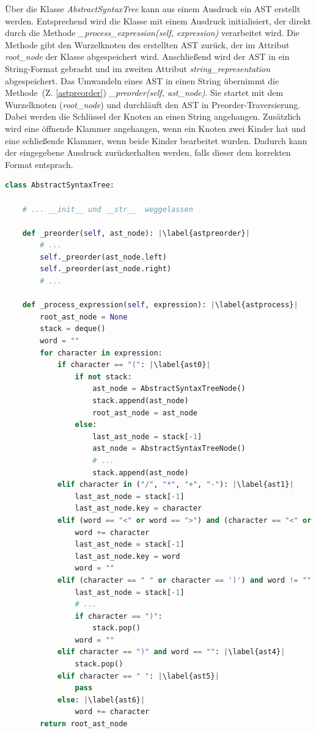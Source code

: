 Über die Klasse \textit{AbstractSyntaxTree} kann aus einem Ausdruck ein AST erstellt werden.
Entsprechend wird die Klasse mit einem Ausdruck initialisiert, der direkt durch die Methode \textit{\_process\_expression(self, expression)} verarbeitet wird.
Die Methode gibt den Wurzelknoten des erstellten AST zurück, der im Attribut \textit{root\_node} der Klasse abgespeichert wird.
Anschließend wird der AST in ein String-Format gebracht und im zweiten Attribut \textit{string\_representation} abgespeichert.
Das Umwandeln eines AST in einen String übernimmt die Methode~(Z. \ref{astpreorder}) \textit{\_preorder(self, ast\_node)}. Sie startet mit dem Wurzelknoten (\textit{root\_node})
und durchläuft den AST in Preorder-Traversierung. Dabei werden die Schlüssel der Knoten an einen String angehangen. Zusätzlich wird eine öffnende Klammer
angehangen, wenn ein Knoten zwei Kinder hat und eine schließende Klammer, wenn beide Kinder bearbeitet wurden. Dadurch kann der eingegebene Ausdruck zurückerhalten werden, falls
dieser dem korrekten Format entsprach.

\begin{lstlisting}[language=Python, escapechar=|, caption=Auszug aus der Klasse \textit{AbstractSyntaxTree}, label={lst:ast}]
class AbstractSyntaxTree:

    # ... __init__ und __str__  weggelassen 

    def _preorder(self, ast_node): |\label{astpreorder}|
        # ...
        self._preorder(ast_node.left)
        self._preorder(ast_node.right)
        # ...

    def _process_expression(self, expression): |\label{astprocess}|
        root_ast_node = None
        stack = deque()
        word = ""
        for character in expression:
            if character == "(": |\label{ast0}|
                if not stack:
                    ast_node = AbstractSyntaxTreeNode()
                    stack.append(ast_node)
                    root_ast_node = ast_node
                else:
                    last_ast_node = stack[-1]
                    ast_node = AbstractSyntaxTreeNode()
                    # ...
                    stack.append(ast_node)
            elif character in ("/", "*", "+", "-"): |\label{ast1}|
                last_ast_node = stack[-1]
                last_ast_node.key = character
            elif (word == "<" or word == ">") and (character == "<" or character == ">"): |\label{ast2}|
                word += character
                last_ast_node = stack[-1]
                last_ast_node.key = word
                word = ""
            elif (character == " " or character == ')') and word != "": |\label{ast3}|
                last_ast_node = stack[-1]
                # ...
                if character == ")":
                    stack.pop()
                word = ""
            elif character == ")" and word == "": |\label{ast4}|
                stack.pop()
            elif character == " ": |\label{ast5}|
                pass
            else: |\label{ast6}|
                word += character
        return root_ast_node
\end{lstlisting}

